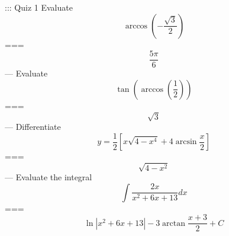 ::: Quiz 1
Evaluate
\[\arccos\left(-\frac{\sqrt{3}}{2}\right)\]
===
\[\frac{5\pi}{6}\]
---
Evaluate
\[\tan\left(\arccos\left(\frac{1}{2}\right)\right)\]
===
\[\sqrt{3}\]
---
Differentiate
\[y=\frac{1}{2}\left[x\sqrt{4-x^4}+4\arcsin\frac{x}{2}\right]\]
===
\[\sqrt{4-x^2}\]
---
Evaluate the integral
\[\int\frac{2x}{x^2+6x+13}dx\]
===
\[\ln\left|x^2+6x+13\right|-3\arctan\frac{x+3}{2}+C\]
